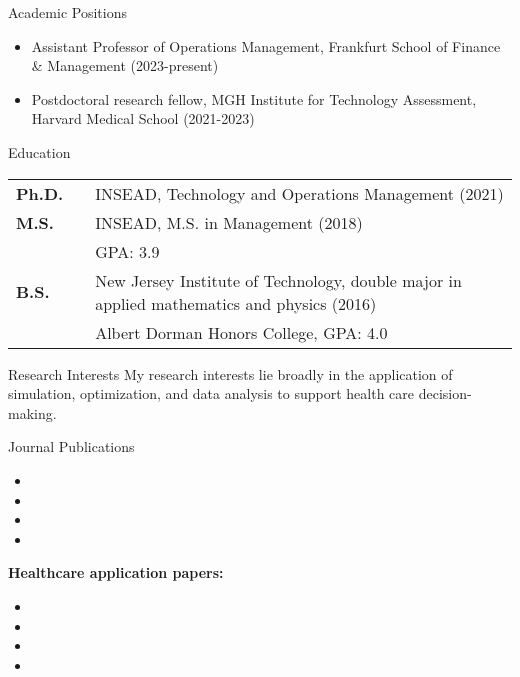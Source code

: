 \documentclass{resume}
\begin{document}


\begin{rSection}{Academic Positions}
  \begin{itemize}
    \item Assistant Professor of Operations Management, Frankfurt School of Finance \& Management (2023-present)
    \item Postdoctoral research fellow, MGH Institute for Technology Assessment, Harvard Medical School (2021-2023)
  \end{itemize}
\end{rSection}


\begin{rSection}{Education}

\begin{tabular}{lll}
\textbf{Ph.D.} & & INSEAD, Technology and Operations Management (2021)\\
\textbf{M.S.} & & INSEAD, M.S. in Management (2018)\\
& & GPA: 3.9\\
\textbf{B.S.} & & New Jersey Institute of Technology, double major in applied mathematics and physics (2016)\\
& & Albert Dorman Honors College, GPA: 4.0
\end{tabular}

\end{rSection}

\begin{rSection}{Research Interests}
My research interests lie broadly in the application of simulation, optimization, and data analysis to support health care decision-making.
\end{rSection}

\begin{rSection}{Journal Publications}
\begin{itemize}
\item {}
\item {}
\item {}
\item {}
\end{itemize}
\textbf{Healthcare application papers:}
\begin{itemize}
  \item {}
  \item {}
  \item {}
  \item {}
\end{itemize}
\end{rSection}
\end{document}
